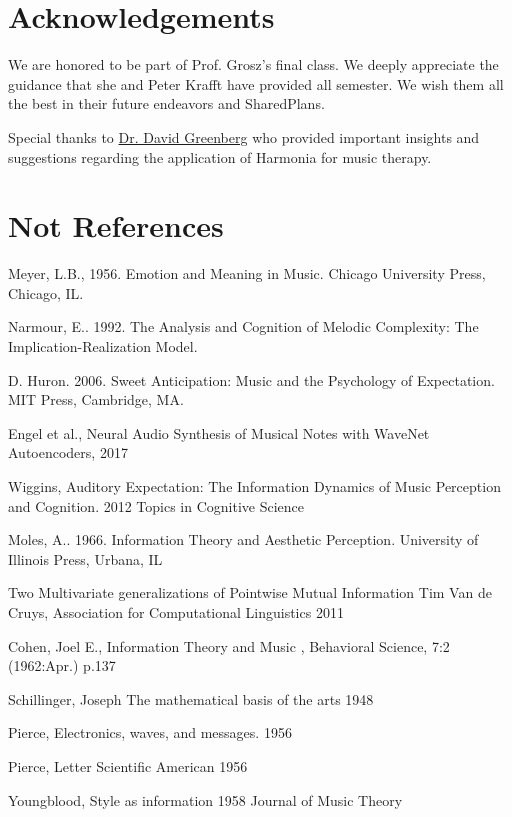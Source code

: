 \documentclass[final,authoryear,5p,times,twocolumn]{elsarticle}
\begin{document}
 
\section*{Acknowledgements}

We are honored to be part of Prof. Grosz's final class. We deeply appreciate the guidance that she and Peter Krafft have provided all semester. We wish them all the best in their future endeavors and SharedPlans.

Special thanks to \href{https://www.psychologytoday.com/experts/david-m-greenberg-phd}{Dr. David Greenberg} who provided important insights and suggestions regarding the application of Harmonia for music therapy.

\section*{Not References}

 
Meyer, L.B., 1956. Emotion and Meaning in Music. Chicago University Press, Chicago, IL.

Narmour, E.. 1992. The Analysis and Cognition of Melodic Complexity: The Implication-Realization Model.

D. Huron. 2006. Sweet Anticipation: Music and the Psychology of Expectation. MIT Press, Cambridge, MA.

Engel et al., Neural Audio Synthesis of Musical Notes with WaveNet Autoencoders, 2017

Wiggins, Auditory Expectation: The Information Dynamics of Music Perception and Cognition. 2012 Topics in Cognitive Science

Moles, A.. 1966. Information Theory and Aesthetic Perception. University of Illinois Press, Urbana, IL

Two Multivariate generalizations of Pointwise Mutual Information Tim Van de Cruys, Association for Computational Linguistics 2011

Cohen, Joel E., Information Theory and Music , Behavioral Science, 7:2 (1962:Apr.) p.137

Schillinger, Joseph The mathematical basis of the arts 1948

Pierce, Electronics, waves, and messages. 1956

Pierce, Letter Scientific American 1956

Youngblood, Style as information 1958 Journal of Music Theory

%
%             



\end{document}
